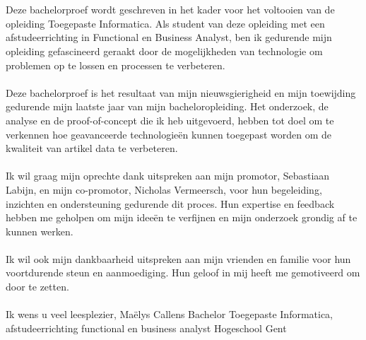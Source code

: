 
\chapter*{}%
\label{ch:voorwoord}


Deze bachelorproef wordt geschreven in het kader voor het voltooien van de opleiding Toegepaste Informatica. Als student van deze opleiding met een afstudeerrichting in Functional en Business Analyst, ben ik gedurende mijn opleiding gefascineerd geraakt door de mogelijkheden van technologie om problemen op te lossen en processen te verbeteren.
\\ \\
Deze bachelorproef is het resultaat van mijn nieuwsgierigheid en mijn toewijding gedurende mijn laatste jaar van mijn bacheloropleiding. Het onderzoek, de analyse en de proof-of-concept die ik heb uitgevoerd, hebben tot doel om te verkennen hoe geavanceerde technologieën kunnen toegepast worden om de kwaliteit van artikel data te verbeteren.
\\ \\
Ik wil graag mijn oprechte dank uitspreken aan mijn promotor, Sebastiaan Labijn, en mijn co-promotor, Nicholas Vermeersch, voor hun begeleiding, inzichten en ondersteuning gedurende dit proces. Hun expertise en feedback hebben me geholpen om mijn ideeën te verfijnen en mijn onderzoek grondig af te kunnen werken.
\\ \\
Ik wil ook mijn dankbaarheid uitspreken aan mijn vrienden en familie voor hun voortdurende steun en aanmoediging. Hun geloof in mij heeft me gemotiveerd om door te zetten.
\\ \\ %
Ik wens u veel leesplezier,
\newline Maëlys Callens
\newline Bachelor Toegepaste Informatica, afstudeerrichting functional en business analyst
\newline Hogeschool Gent
